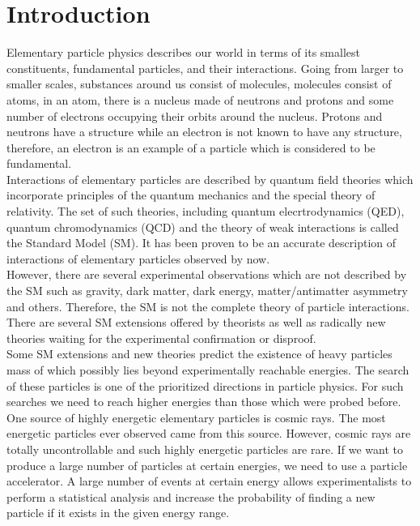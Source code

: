 \section{Introduction}
\label{sec:intro}


Elementary particle physics describes our world in terms of its smallest constituents, fundamental particles, and their interactions. Going from larger to smaller scales, substances around us consist of molecules, molecules consist of atoms, in an atom, there is a nucleus made of neutrons and protons and some number of electrons occupying their orbits around the nucleus. Protons and neutrons have a structure while an electron is not known to have any structure, therefore, an electron is an example of a particle which is considered to be fundamental.\\

Interactions of elementary particles are described by quantum field theories which incorporate principles of the quantum mechanics and the special theory of relativity. The set of such theories, including quantum elecrtrodynamics (QED), quantum chromodynamics (QCD) and the theory of weak interactions is called the Standard Model (SM). It has been proven to be an accurate description of interactions of elementary particles observed by now.\\ 

However, there are several experimental observations which are not described by the SM such as gravity, dark matter, dark energy, matter/antimatter asymmetry and others. Therefore, the SM is not the complete theory of particle interactions. There are several SM extensions offered by theorists as well as radically new theories waiting for the experimental confirmation or disproof. \\

Some SM extensions and new theories predict the existence of heavy particles mass of which possibly lies beyond experimentally reachable energies. The search of these particles is one of the prioritized directions in particle physics. For such searches we need to reach higher energies than those which were probed before. One source of highly energetic elementary particles is cosmic rays. The most energetic particles ever observed came from this source. However, cosmic rays are totally uncontrollable and such highly energetic particles are rare. If we want to produce a large number of particles at certain energies, we need to use a particle accelerator. A large number of events at certain energy allows experimentalists to perform a statistical analysis and increase the probability of finding a new particle if it exists in the given energy range.\\

